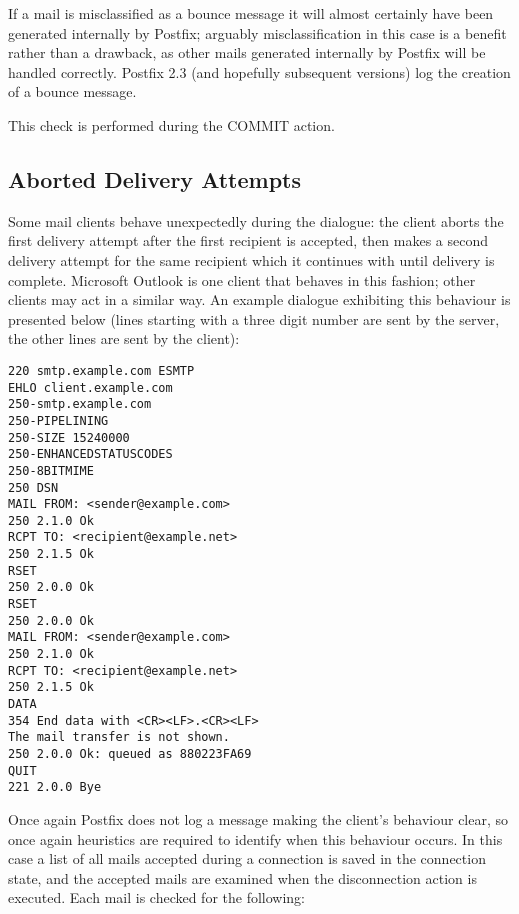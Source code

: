If a mail is misclassified as a bounce message it will almost certainly
have been generated internally by Postfix; arguably misclassification in
this case is a benefit rather than a drawback, as other mails generated
internally by Postfix will be handled correctly.  Postfix 2.3 (and
hopefully subsequent versions) log the creation of a bounce message.

This check is performed during the COMMIT action.

\subsection{Aborted Delivery Attempts}

\label{aborted delivery attempts}

Some mail clients behave unexpectedly during the  dialogue:
the client aborts the first delivery attempt after the first recipient is
accepted, then makes a second delivery attempt for the same recipient which
it continues with until delivery is complete.  Microsoft Outlook is one
client that behaves in this fashion; other clients may act in a similar
way.  An example dialogue exhibiting this behaviour is presented below
(lines starting with a three digit number are sent by the server, the other
lines are sent by the client):

\begin{verbatim}
220 smtp.example.com ESMTP
EHLO client.example.com
250-smtp.example.com
250-PIPELINING
250-SIZE 15240000
250-ENHANCEDSTATUSCODES
250-8BITMIME
250 DSN
MAIL FROM: <sender@example.com>
250 2.1.0 Ok
RCPT TO: <recipient@example.net>
250 2.1.5 Ok
RSET
250 2.0.0 Ok
RSET
250 2.0.0 Ok
MAIL FROM: <sender@example.com>
250 2.1.0 Ok
RCPT TO: <recipient@example.net>
250 2.1.5 Ok
DATA
354 End data with <CR><LF>.<CR><LF>
The mail transfer is not shown.
250 2.0.0 Ok: queued as 880223FA69
QUIT
221 2.0.0 Bye
\end{verbatim}

Once again Postfix does not log a message making the client's behaviour
clear, so once again heuristics are required to identify when this
behaviour occurs.  In this case a list of all mails accepted during a
connection is saved in the connection state, and the accepted mails are
examined when the disconnection action is executed.  Each mail is checked
for the following:

